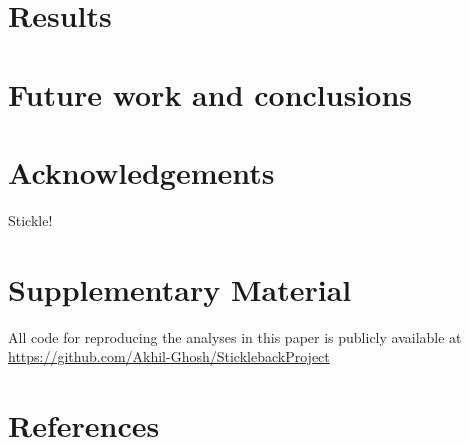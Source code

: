 \documentclass[
  12pt,
]{article}
\begin{document}
\hypertarget{sec:results}{%
\section{Results}\label{sec:results}}

\hypertarget{sec:conclusions}{%
\section{Future work and conclusions}\label{sec:conclusions}}

\hypertarget{acknowledgements}{%
\section*{Acknowledgements}\label{acknowledgements}}

Stickle!

\hypertarget{supplementary-material}{%
\section*{Supplementary Material}\label{supplementary-material}}

All code for reproducing the analyses in this paper is publicly
available at \url{https://github.com/Akhil-Ghosh/SticklebackProject}

\hypertarget{references}{%
\section*{References}\label{references}}
\end{document}
